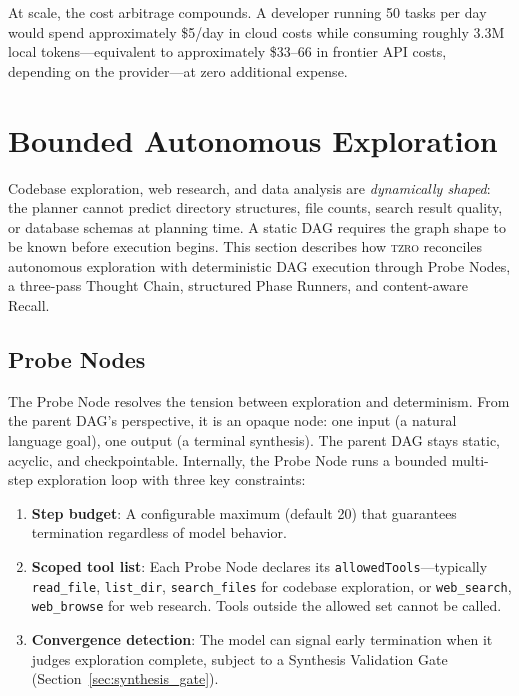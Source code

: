 \documentclass{article}
\begin{document}
At scale, the cost arbitrage compounds.
A developer running 50 tasks per day would spend approximately \$5/day in cloud costs while consuming roughly 3.3M local tokens---equivalent to approximately \$33--66 in frontier API costs, depending on the provider---at zero additional expense.

\section{Bounded Autonomous Exploration}
\label{sec:bounded_exploration}

Codebase exploration, web research, and data analysis are \emph{dynamically shaped}: the planner cannot predict directory structures, file counts, search result quality, or database schemas at planning time.
A static DAG requires the graph shape to be known before execution begins.
This section describes how \textsc{tzro} reconciles autonomous exploration with deterministic DAG execution through Probe Nodes, a three-pass Thought Chain, structured Phase Runners, and content-aware Recall.

\subsection{Probe Nodes}
\label{sec:probe_nodes}

The Probe Node resolves the tension between exploration and determinism.
From the parent DAG's perspective, it is an opaque node: one input (a natural language goal), one output (a terminal synthesis).
The parent DAG stays static, acyclic, and checkpointable.
Internally, the Probe Node runs a bounded multi-step exploration loop with three key constraints:

\begin{enumerate}[leftmargin=*]
\item \textbf{Step budget}: A configurable maximum (default 20) that guarantees termination regardless of model behavior.
\item \textbf{Scoped tool list}: Each Probe Node declares its \texttt{allowedTools}---typically \texttt{read\_file}, \texttt{list\_dir}, \texttt{search\_files} for codebase exploration, or \texttt{web\_search}, \texttt{web\_browse} for web research.
Tools outside the allowed set cannot be called.
\item \textbf{Convergence detection}: The model can signal early termination when it judges exploration complete, subject to a Synthesis Validation Gate (Section~\ref{sec:synthesis_gate}).
\end{enumerate}
\end{document}
